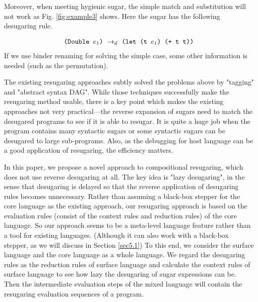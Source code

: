 Moreover, when meeting hygienic sugar, the simple match and substitution will not work as Fig. \ref{fig:example3} shows. Here the  sugar has the following desugaring rule.

\[
\begin{array}{l}
\texttt{(Double $e_1$)} ~\rightarrow_d~ \texttt{(let (t $e_1$) (+ t t))}\\
\end{array}
\]
If we use binder renaming for solving the simple case, some other information is needed (such as the permutation).



The existing resugaring approaches subtly solved the problems above by "tagging"\cite{resugaring} and "abstract syntax DAG"\cite{hygienic}. While those techniques successfully make the resugaring method usable, there is a key point which makes the existing approaches not very practical---the reverse expansion of sugars need to match the desugared programs to see if it is able to resugar. It is quite a huge job when the program contains many syntactic sugars or some syntactic sugars can be desugared to large sub-programs.
Also, as the debugging for host language can be a good application of resugaring, the efficiency matters.



\label{mark:mention}
In this paper, we propose a novel approach to compositional resugaring, which does not use reverse desugaring at all.
The key idea is "lazy desugaring", in the sense that desugaring is delayed so that the reverse application of desugaring rules becomes unnecessary. Rather than assuming a black-box stepper for the core language as the existing approach, our resugaring approach is based on the evaluation rules (consist of the context rules and reduction rules) of the core language. So our approach seems to be a meta-level language feature rather than a tool for existing languages. (Although it can also work with a black-box stepper, as we will discuss in Section \ref{sec5.1})
To this end, we consider the surface language and the core language as a whole language. We regard the desugaring rules as the reduction rules of surface language and calculate the context rules of surface language to see how lazy the desugaring of sugar expressions can be. Then the intermediate evaluation steps of the mixed language will contain the resugaring evaluation sequences of a program.


